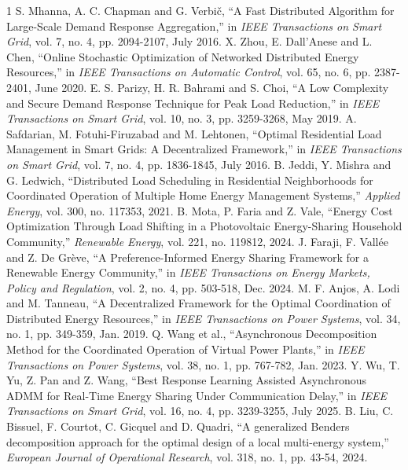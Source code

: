 \documentclass[journal]{IEEEtran}
\begin{document}
\begin{thebibliography}{1}
S. Mhanna, A. C. Chapman and G. Verbič, ``A Fast Distributed Algorithm for Large-Scale Demand Response Aggregation,'' in \textit{IEEE Transactions on Smart Grid}, vol. 7, no. 4, pp. 2094-2107, July 2016.
X. Zhou, E. Dall’Anese and L. Chen, ``Online Stochastic Optimization of Networked Distributed Energy Resources,'' in \textit{IEEE Transactions on Automatic Control}, vol. 65, no. 6, pp. 2387-2401, June 2020.
E. S. Parizy, H. R. Bahrami and S. Choi, ``A Low Complexity and Secure Demand Response Technique for Peak Load Reduction,'' in \textit{IEEE Transactions on Smart Grid}, vol. 10, no. 3, pp. 3259-3268, May 2019.
A. Safdarian, M. Fotuhi-Firuzabad and M. Lehtonen, ``Optimal Residential Load Management in Smart Grids: A Decentralized Framework,'' in \textit{IEEE Transactions on Smart Grid}, vol. 7, no. 4, pp. 1836-1845, July 2016.
B. Jeddi, Y. Mishra and G. Ledwich, ``Distributed Load Scheduling in Residential Neighborhoods for Coordinated Operation of Multiple Home Energy Management Systems,'' \textit{Applied Energy}, vol. 300, no. 117353, 2021.
B. Mota, P. Faria and Z. Vale, ``Energy Cost Optimization Through Load Shifting in a Photovoltaic Energy-Sharing Household Community,'' \textit{Renewable Energy}, vol. 221, no. 119812, 2024.
J. Faraji, F. Vallée and Z. De Grève, ``A Preference-Informed Energy Sharing Framework for a Renewable Energy Community,'' in \textit{IEEE Transactions on Energy Markets, Policy and Regulation}, vol. 2, no. 4, pp. 503-518, Dec. 2024.
M. F. Anjos, A. Lodi and M. Tanneau, ``A Decentralized Framework for the Optimal Coordination of Distributed Energy Resources,'' in \textit{IEEE Transactions on Power Systems}, vol. 34, no. 1, pp. 349-359, Jan. 2019.
Q. Wang et al., ``Asynchronous Decomposition Method for the Coordinated Operation of Virtual Power Plants,'' in \textit{IEEE Transactions on Power Systems}, vol. 38, no. 1, pp. 767-782, Jan. 2023.
Y. Wu, T. Yu, Z. Pan and Z. Wang, ``Best Response Learning Assisted Asynchronous ADMM for Real-Time Energy Sharing Under Communication Delay,'' in \textit{IEEE Transactions on Smart Grid}, vol. 16, no. 4, pp. 3239-3255, July 2025.
B. Liu, C. Bissuel, F. Courtot, C. Gicquel and D. Quadri, ``A generalized Benders decomposition approach for the optimal design of a local multi-energy system,'' \textit{European Journal of Operational Research}, vol. 318, no. 1, pp. 43-54, 2024.

\end{thebibliography}
\end{document}
